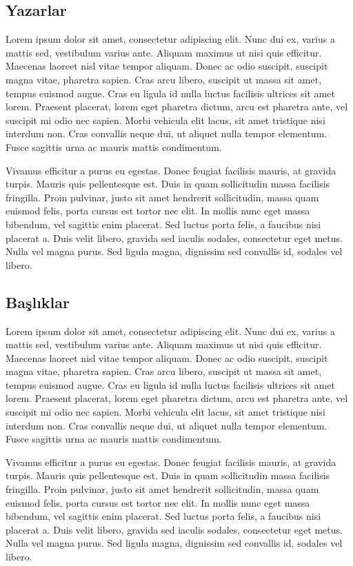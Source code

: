 \documentclass[conference]{IEEEtran}
\begin{document}
\subsection{Yazarlar}

Lorem ipsum dolor sit amet, consectetur adipiscing elit. Nunc dui ex, varius a mattis sed, vestibulum varius ante. Aliquam maximus ut nisi quis efficitur. Maecenas laoreet nisl vitae tempor aliquam. Donec ac odio suscipit, suscipit magna vitae, pharetra sapien. Cras arcu libero, suscipit ut massa sit amet, tempus euismod augue. Cras eu ligula id nulla luctus facilisis ultrices sit amet lorem. Praesent placerat, lorem eget pharetra dictum, arcu est pharetra ante, vel suscipit mi odio nec sapien. Morbi vehicula elit lacus, sit amet tristique nisi interdum non. Cras convallis neque dui, ut aliquet nulla tempor elementum. Fusce sagittis urna ac mauris mattis condimentum.

Vivamus efficitur a purus eu egestas. Donec feugiat facilisis mauris, at gravida turpis. Mauris quis pellentesque est. Duis in quam sollicitudin massa facilisis fringilla. Proin pulvinar, justo sit amet hendrerit sollicitudin, massa quam euismod felis, porta cursus est tortor nec elit. In mollis nunc eget massa bibendum, vel sagittis enim placerat. Sed luctus porta felis, a faucibus nisi placerat a. Duis velit libero, gravida sed iaculis sodales, consectetur eget metus. Nulla vel magna purus. Sed ligula magna, dignissim sed convallis id, sodales vel libero.

\subsection{Başlıklar}

Lorem ipsum dolor sit amet, consectetur adipiscing elit. Nunc dui ex, varius a mattis sed, vestibulum varius ante. Aliquam maximus ut nisi quis efficitur. Maecenas laoreet nisl vitae tempor aliquam. Donec ac odio suscipit, suscipit magna vitae, pharetra sapien. Cras arcu libero, suscipit ut massa sit amet, tempus euismod augue. Cras eu ligula id nulla luctus facilisis ultrices sit amet lorem. Praesent placerat, lorem eget pharetra dictum, arcu est pharetra ante, vel suscipit mi odio nec sapien. Morbi vehicula elit lacus, sit amet tristique nisi interdum non. Cras convallis neque dui, ut aliquet nulla tempor elementum. Fusce sagittis urna ac mauris mattis condimentum.

Vivamus efficitur a purus eu egestas. Donec feugiat facilisis mauris, at gravida turpis. Mauris quis pellentesque est. Duis in quam sollicitudin massa facilisis fringilla. Proin pulvinar, justo sit amet hendrerit sollicitudin, massa quam euismod felis, porta cursus est tortor nec elit. In mollis nunc eget massa bibendum, vel sagittis enim placerat. Sed luctus porta felis, a faucibus nisi placerat a. Duis velit libero, gravida sed iaculis sodales, consectetur eget metus. Nulla vel magna purus. Sed ligula magna, dignissim sed convallis id, sodales vel libero.
\end{document}
